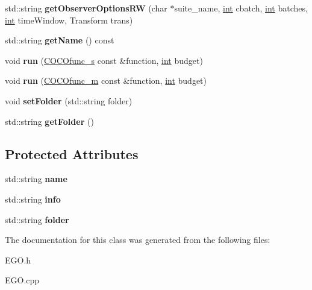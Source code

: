 \begin{DoxyCompactItemize}
\item 
std\+::string {\bfseries get\+Observer\+Options\+RW} (char $\ast$suite\+\_\+name, \hyperlink{classint}{int} cbatch, \hyperlink{classint}{int} batches, \hyperlink{classint}{int} time\+Window, Transform trans)\hypertarget{classCocoOptimiser_afc334f80b0aee491d2452f7f89402d17}{}\label{classCocoOptimiser_afc334f80b0aee491d2452f7f89402d17}

\item 
std\+::string {\bfseries get\+Name} () const \hypertarget{classCocoOptimiser_a265bd5d524ea5b10d5e9f4028cdc386c}{}\label{classCocoOptimiser_a265bd5d524ea5b10d5e9f4028cdc386c}

\item 
void {\bfseries run} (\hyperlink{classCOCOfunc__s}{C\+O\+C\+Ofunc\+\_\+s} const \&function, \hyperlink{classint}{int} budget)\hypertarget{classCocoOptimiser_a5842d02046cb097f0e11c84329f32799}{}\label{classCocoOptimiser_a5842d02046cb097f0e11c84329f32799}

\item 
void {\bfseries run} (\hyperlink{classCOCOfunc__m}{C\+O\+C\+Ofunc\+\_\+m} const \&function, \hyperlink{classint}{int} budget)\hypertarget{classCocoOptimiser_a1ad475649fa2f85129a8db7457cffeab}{}\label{classCocoOptimiser_a1ad475649fa2f85129a8db7457cffeab}

\item 
void {\bfseries set\+Folder} (std\+::string folder)\hypertarget{classCocoOptimiser_a2bfb5ff0b5420e95c6736070d4853eea}{}\label{classCocoOptimiser_a2bfb5ff0b5420e95c6736070d4853eea}

\item 
std\+::string {\bfseries get\+Folder} ()\hypertarget{classCocoOptimiser_aedb7b8bd6951c363b3ecbeb878cd0539}{}\label{classCocoOptimiser_aedb7b8bd6951c363b3ecbeb878cd0539}

\end{DoxyCompactItemize}
\subsection*{Protected Attributes}
\begin{DoxyCompactItemize}
\item 
std\+::string {\bfseries name}\hypertarget{classCocoOptimiser_a6832a1c556a6af0f47b0e1de31fc7488}{}\label{classCocoOptimiser_a6832a1c556a6af0f47b0e1de31fc7488}

\item 
std\+::string {\bfseries info}\hypertarget{classCocoOptimiser_a01d71a1cc52374efb3d9e0b4c80e44e7}{}\label{classCocoOptimiser_a01d71a1cc52374efb3d9e0b4c80e44e7}

\item 
std\+::string {\bfseries folder}\hypertarget{classCocoOptimiser_a92f48d32c1606ebee1f3d4d432553f4c}{}\label{classCocoOptimiser_a92f48d32c1606ebee1f3d4d432553f4c}

\end{DoxyCompactItemize}


The documentation for this class was generated from the following files\+:\begin{DoxyCompactItemize}
\item 
E\+G\+O.\+h\item 
E\+G\+O.\+cpp\end{DoxyCompactItemize}
